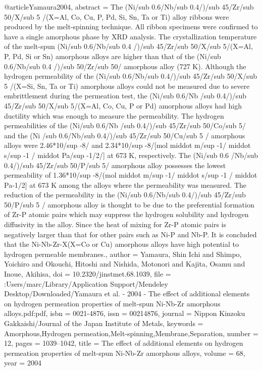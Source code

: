 @article{Yamaura2004,
abstract = {The (Ni/sub 0.6/Nb/sub 0.4/)/sub 45/Zr/sub 50/X/sub 5 /(X=Al, Co, Cu, P, Pd, Si, Sn, Ta or Ti) alloy ribbons were produced by the melt-spinning technique. All ribbon specimens were confirmed to have a single amorphous phase by XRD analysis. The crystallization temperature of the melt-spun (Ni/sub 0.6/Nb/sub 0.4 /)/sub 45/Zr/sub 50/X/sub 5/(X=Al, P, Pd, Si or Sn) amorphous alloys are higher than that of the (Ni/sub 0.6/Nb/sub 0.4 /)/sub 50/Zr/sub 50/ amorphous alloy (727 K). Although the hydrogen permeability of the (Ni/sub 0.6/Nb/sub 0.4/)/sub 45/Zr/sub 50/X/sub 5 /(X=Si, Sn, Ta or Ti) amorphous alloys could not be measured due to severe embrittlement during the permeation test, the (Ni/sub 0.6/Nb /sub 0.4/)/sub 45/Zr/sub 50/X/sub 5/(X=Al, Co, Cu, P or Pd) amorphous alloys had high ductility which was enough to measure the permeability. The hydrogen permeabilities of the (Ni/sub 0.6/Nb /sub 0.4/)/sub 45/Zr/sub 50/Co/sub 5/ and the (Ni /sub 0.6/Nb/sub 0.4/)/sub 45/Zr/sub 50/Cu/sub 5 / amorphous alloys were 2.46*10/sup -8/ and 2.34*10/sup -8/[mol middot m/sup -1/ middot s/sup -1 / middot Pa/sup -1/2/] at 673 K, respectively. The (Ni/sub 0.6 /Nb/sub 0.4/)/sub 45/Zr/sub 50/P/sub 5/ amorphous alloy possesses the lowest permeability of 1.36*10/sup -8/(mol middot m/sup -1/ middot s/sup -1 / middot Pa-1/2] at 673 K among the alloys where the permeability was measured. The reduction of the permeability in the (Ni/sub 0.6/Nb/sub 0.4/)/sub 45/Zr/sub 50/P/sub 5 / amorphous alloy is thought to be due to the preferential formation of Zr-P atomic pairs which may suppress the hydrogen solubility and hydrogen diffusivity in the alloy. Since the heat of mixing for Zr-P atomic pairs is negatively larger than that for other pairs such as Ni-P and Nb-P. It is concluded that the Ni-Nb-Zr-X(X=Co or Cu) amorphous alloys have high potential to hydrogen permeable membranes.},
author = {Yamaura, Shin Ichi and Shimpo, Yoichiro and Okouchi, Hitoshi and Nishida, Motonori and Kajita, Osamu and Inoue, Akihisa},
doi = {10.2320/jinstmet.68.1039},
file = {:Users/marc/Library/Application Support/Mendeley Desktop/Downloaded/Yamaura et al. - 2004 - The effect of additional elements on hydrogen permeation properties of melt-spun Ni-Nb-Zr amorphous alloys.pdf:pdf},
isbn = {0021-4876},
issn = {00214876},
journal = {Nippon Kinzoku Gakkaishi/Journal of the Japan Institute of Metals},
keywords = {Amorphous,Hydrogen permeation,Melt-spinning,Membrane,Separation},
number = {12},
pages = {1039--1042},
title = {{The effect of additional elements on hydrogen permeation properties of melt-spun Ni-Nb-Zr amorphous alloys}},
volume = {68},
year = {2004}
}
